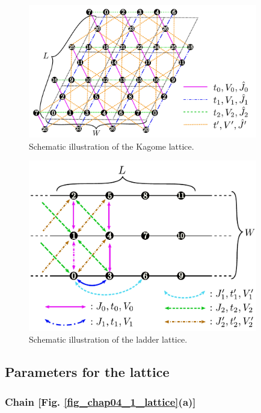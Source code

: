 \begin{itemize}
\begin{figure}[!tbhp]
  \begin{center}
    \includegraphics[width=10cm]{../figs/kagome.pdf}
    \caption{Schematic illustration of the Kagome lattice.
    }
    \label{fig_kagome}
  \end{center}
\end{figure}

\begin{figure}[!tbhp]
  \begin{center}
    \includegraphics[width=10cm]{../figs/ladder.pdf}
    \caption{Schematic illustration of the ladder lattice.
    }
    \label{fig_ladder}
  \end{center}
\end{figure}

\end{itemize}

\subsection{Parameters for the lattice}

\subsubsection{Chain [Fig. \ref{fig_chap04_1_lattice}(a)]}

